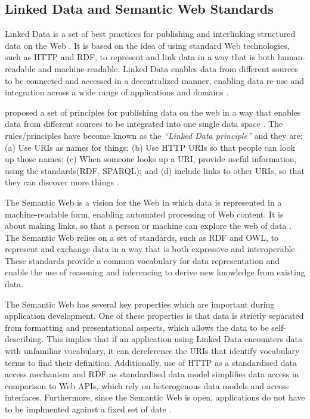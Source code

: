 \subsection{Linked Data and Semantic Web Standards}

Linked Data is a set of best practices for publishing and interlinking structured data on the Web \citep{bizer2011linkedData}.  It is based on the idea of using standard Web technologies, such as HTTP and RDF, to represent and link data in a way that is both human-readable and machine-readable.  Linked Data enables data from different sources to be connected and accessed in a decentralized manner, enabling data re-use and integration across a wide range of applications and domains \citep{bizer2011linkedData}.

\citep{lee2006exploring} proposed a set of principles for publishing data on the web in a way that enables data from different sources to be integrated into one single data space \citep{bizer2011linkedData}.  The rules/principles have become known as the \textit{``Linked Data principle''} and they are: (a) Use URIs as names for things; (b) Use HTTP URIs so that people can look up those names; (c) When someone looks up a URI, provide useful information, using the standards(RDF, SPARQL); and (d) include links to other URIs, so that they can discover more things \citep{bizer2011linkedData,lee2006exploring}.

The Semantic Web is a vision for the Web in which data is represented in a machine-readable form, enabling automated processing of Web content.  It is about making links, so that a person or machine can explore the web of data \citep{bizer2011linkedData}.  The Semantic Web relies on a set of standards, such as RDF and OWL, to represent and exchange data in a way that is both expressive and interoperable.  These standards provide a common vocabulary for data representation and enable the use of reasoning and inferencing to derive new knowledge from existing data.

The Semantic Web has several key properties which are important during application development.  One of these properties is that data is strictly separated from formatting and presentational aspects, which allows the data to be self-describing.  This implies that if an application using Linked Data encounters data with unfamiliar vocabulary, it can dereference the URIs that identify vocabulary terms to find their definition.  Additionally, use of HTTP as a standardised data access mechanism and RDF as standardised data model simplifies data access in comparison to Web APIs, which rely on heterogenous data models and access interfaces.  Furthermore, since the Semantic Web is open, applications do not have to be implmented against a fixed set of date \citep{bizer2011linkedData}.

